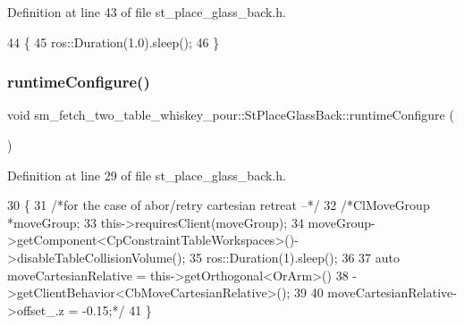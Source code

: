 Definition at line 43 of file st\+\_\+place\+\_\+glass\+\_\+back.\+h.


\begin{DoxyCode}
44         \{
45             ros::Duration(1.0).sleep();
46         \}
\end{DoxyCode}
\mbox{\label{structsm__fetch__two__table__whiskey__pour_1_1StPlaceGlassBack_a8a0fa1b8c421f4a9d208531c71dde335}} 
\subsubsection{\texorpdfstring{runtime\+Configure()}{runtimeConfigure()}}
{\footnotesize\ttfamily void sm\+\_\+fetch\+\_\+two\+\_\+table\+\_\+whiskey\+\_\+pour\+::\+St\+Place\+Glass\+Back\+::runtime\+Configure (\begin{DoxyParamCaption}{ }\end{DoxyParamCaption})\hspace{0.3cm}{\ttfamily [inline]}}



Definition at line 29 of file st\+\_\+place\+\_\+glass\+\_\+back.\+h.


\begin{DoxyCode}
30         \{
31             \textcolor{comment}{/*for the case of abor/retry cartesian retreat --*/}
32             \textcolor{comment}{/*ClMoveGroup *moveGroup;}
33 \textcolor{comment}{            this->requiresClient(moveGroup);}
34 \textcolor{comment}{            moveGroup->getComponent<CpConstraintTableWorkspaces>()->disableTableCollisionVolume();}
35 \textcolor{comment}{            ros::Duration(1).sleep();}
36 \textcolor{comment}{}
37 \textcolor{comment}{            auto moveCartesianRelative = this->getOrthogonal<OrArm>()}
38 \textcolor{comment}{                                             ->getClientBehavior<CbMoveCartesianRelative>();}
39 \textcolor{comment}{}
40 \textcolor{comment}{            moveCartesianRelative->offset\_.z = -0.15;*/}
41         \}
\end{DoxyCode}
\mbox{\label{structsm__fetch__two__table__whiskey__pour_1_1StPlaceGlassBack_ae9bd64e9ec60d3430b8f29a2793a2634}} 
